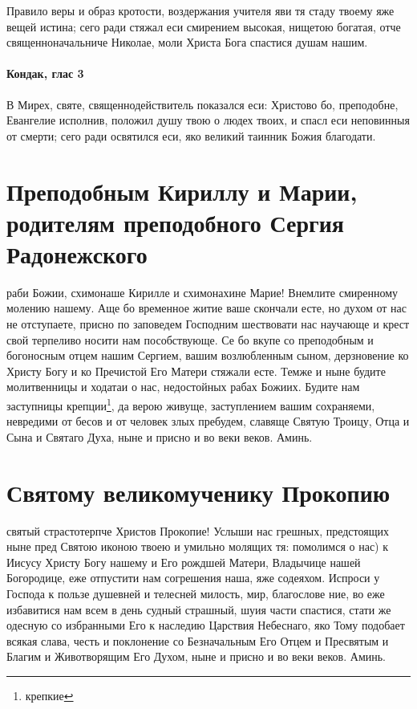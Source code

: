 \documentclass{book}
\newcommand{\mychapter}[1]{
    \chapter{#1}
}
\newcommand\mysubsubsection[1]{
    \subsubsection{#1}
}
\newenvironment{mymulticols}[1]{}{}
\newcommand{\mychapterending}[1][2.5]{}
\begin{document}
\begin{mymulticols}
\mysubsubsection{Тропарь, глас 4}

Правило веры и образ кротости, воздержания учителя яви тя стаду твоему яже вещей истина; сего ради стяжал еси смирением высокая, нищетою богатая, отче священноначальниче Николае, моли Христа Бога спастися душам нашим.

\mysubsubsection{Кондак, глас 3}

В Мирех, святе, священнодействитель показался еси: Христово бо, преподобне, Евангелие исполнив, положил душу твою о людех твоих, и спасл еси неповинныя от смерти; сего ради освятился еси, яко великий таинник Божия благодати. 

\end{mymulticols}

\mychapterending

\mychapter{Преподобным Кириллу и Марии, родителям преподобного Сергия Радонежского}\begin{mymulticols}

О раби Божии, схимонаше Кирилле и схимонахине Марие! Внемлите смиренному молению нашему. Аще бо временное житие ваше скончали есте, но духом от нас не отступаете, присно по заповедем Господним шествовати нас научающе и крест свой терпеливо носити нам пособствующе. Се бо вкупе со преподобным и богоносным отцем нашим Сергием, вашим возлюбленным сыном, дерзновение ко Христу Богу и ко Пречистой Его Матери стяжали есте. Темже и ныне будите молитвенницы и ходатаи о нас, недостойных рабах Божиих. Будите нам заступницы крепции\footnote{крепкие}, да верою живуще, заступлением вашим сохраняеми, невредими от бесов и от человек злых пребудем, славяще Святую Троицу, Отца и Сына и Святаго Духа, ныне и присно и во веки веков. Аминь. 

\end{mymulticols}

\mychapterending

\mychapter{Святому великомученику Прокопию}\begin{mymulticols}
 
О святый страстотерпче Христов Прокопие! Услыши нас грешных, предстоящих ныне пред Святою иконою твоею и умильно молящих тя: помолимся о нас) к Иисусу Христу Богу нашему и Его рождшей Матери, Владычице нашей Богородице, еже отпустити нам согрешения наша, яже содеяхом. Испроси у Господа к пользе душевней и телесней милость, мир, благослове ние, во еже избавитися нам всем в день судный страшный, шуия части спастися, стати же одесную со избранными Его к наследию Царствия Небеснаго, яко Тому подобает всякая слава, честь и поклонение со Безначальным Его Отцем и Пресвятым и Благим и Животворящим Его Духом, ныне и присно и во веки веков. Аминь.

\end{mymulticols}
\end{document}
